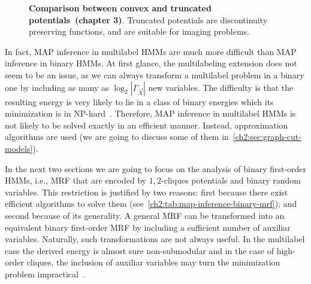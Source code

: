 \begin{figure}
\center
{}\hspace{1em}
\hspace{1em}
\caption{\textbf{Comparison between convex and truncated potentials~\cite{blake11markov}(chapter 3)}. Truncated potentials are discontinuity preserving functions, and are suitable for imaging problems.}
\label{ch2:fig:comparison-convex-truncated}
\end{figure}

In fact, MAP inference in multilabel HMMs are much more difficult than MAP inference in binary HMMs. At first glance, the multilabeling extension does not seem to be an issue, as we can always transform a multilabel problem in a binary one by including as many as $\log_2 |\Gamma_{\vec{X}}|$ new variables. The difficulty is that the resulting energy is very likely to lie in a class of binary energies which its minimization is in NP-hard~\cite{ramalingam08}. Therefore, MAP inference in multilabel HMMs is not likely to be solved exactly in an efficient manner. Instead, approximation algorithms are used (we are going to discuss some of them in~\cref{ch2:sec:graph-cut-models}).

In the next two sections we are going to focus on the analysis of binary first-order HMMs, i.e., MRF that are encoded by $1,2$-cliques potentials and binary random variables. This restriction is justified by two reasons: first because there exist efficient algorithms to solve them (see~\cref{ch2:tab:map-inference-binary-mrf}); and second because of its generality. A general MRF can be transformed into an equivalent binary first-order MRF by including a sufficient number of auxiliar variables. Naturally, such transformations are not always useful. In the multilabel case the derived energy is almost sure non-submodular and in the case of high-order cliques, the inclusion of auxiliar variables may turn the minimization problem impractical~\cite{ishikawa10}.


